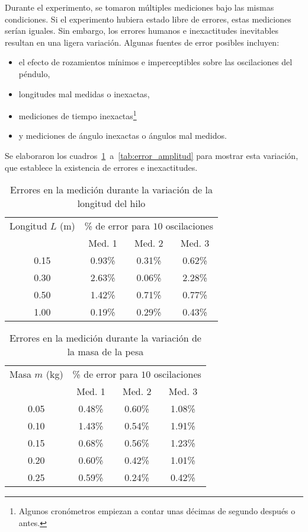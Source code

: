 \documentclass[twocolumn]{article}
\numberwithin{table}{section}
\begin{document}
Durante el experimento, se tomaron múltiples mediciones bajo las mismas
condiciones. Si el experimento hubiera estado libre de errores, estas
mediciones serían iguales. Sin embargo, los errores humanos e inexactitudes
inevitables resultan en una ligera variación. Algunas fuentes de
error posibles incluyen:

\begin{itemize}
  \item el efecto de rozamientos mínimos e imperceptibles sobre las
    oscilaciones del péndulo,
  \item longitudes mal medidas o inexactas,
  \item mediciones de tiempo inexactas\footnote{Algunos cronómetros
    empiezan a contar unas décimas de segundo después o antes.}
  \item y mediciones de ángulo inexactas o ángulos mal medidos.
\end{itemize}

Se elaboraron los cuadros~\ref{tab:error_longitud}~a~\ref{tab:error_amplitud}
para mostrar esta variación, que establece la existencia de errores e
inexactitudes.

\begin{table}[ht]
  \centering
  \begin{tabular}{cccc}
    \toprule
    Longitud $L$ (m) & \multicolumn{3}{c}{\% de error para $10$
    oscilaciones} \\
    \cmidrule(lr){2-4}
    & Med. 1 & Med. 2 & Med. 3  \\
    \midrule
    0.15 & 0.93\% & 0.31\% & 0.62\% \\
    0.30 & 2.63\% & 0.06\% & 2.28\% \\
    0.50 & 1.42\% & 0.71\% & 0.77\% \\
    1.00 & 0.19\% & 0.29\% & 0.43\% \\
    \bottomrule
  \end{tabular}
  \caption{Errores en la medición durante la variación de la
  longitud del hilo}\label{tab:error_longitud}
\end{table}

\begin{table}[ht]
  \centering
  \begin{tabular}{cccc}
    \toprule
    Masa $m$ (kg) & \multicolumn{3}{c}{\% de error para $10$
    oscilaciones} \\
    \cmidrule(lr){2-4}
    & Med. 1 & Med. 2 & Med. 3  \\
    \midrule
    0.05 & 0.48\% & 0.60\% & 1.08\% \\
    0.10 & 1.43\% & 0.54\% & 1.91\% \\
    0.15 & 0.68\% & 0.56\% & 1.23\% \\
    0.20 & 0.60\% & 0.42\% & 1.01\% \\
    0.25 & 0.59\% & 0.24\% & 0.42\% \\
    \bottomrule
  \end{tabular}
  \caption{Errores en la medición durante la variación de la
  masa de la pesa}\label{tab:error_masa}
\end{table}
\end{document}
